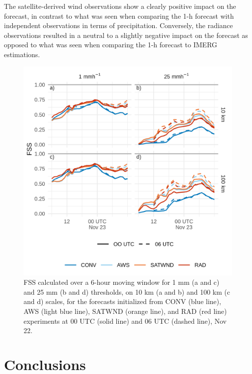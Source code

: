 \documentclass[authoryear,preprint,review,12pt]{elsarticle} %
\begin{document}
The satellite-derived wind observations show a clearly positive impact on the forecast, in contrast to what was seen when comparing the 1-h forecast with independent observations in terms of precipitation. Conversely, the radiance observations resulted in a neutral to a slightly negative impact on the forecast as opposed to what was seen when comparing the 1-h forecast to IMERG estimations.



\begin{figure}
\centering
\includegraphics{../figures/fssfcst-1.png}
\caption{\label{fig:fssfcst}FSS calculated over a 6-hour moving window for 1 mm (a and c) and 25 mm (b and d) thresholds, on 10 km (a and b) and 100 km (c and d) scales, for the forecasts initialized from CONV (blue line), AWS (light blue line), SATWND (orange line), and RAD (red line) experiments at 00 UTC (solid line) and 06 UTC (dashed line), Nov 22.}
\end{figure}

\hypertarget{conclusions}{%
\section{Conclusions}\label{conclusions}}
\end{document}
